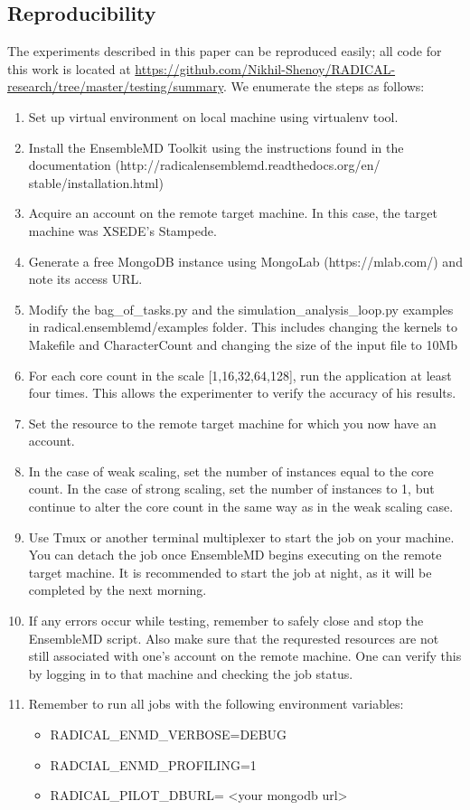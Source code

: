 \documentclass[]{article}
\begin{document}
	\subsection{Reproducibility}
		The experiments described in this paper can be reproduced easily; all code for this work is located at \url{https://github.com/Nikhil-Shenoy/RADICAL-research/tree/master/testing/summary}. We enumerate the steps as follows:
		\begin{enumerate}
			\item Set up virtual environment on local machine using virtualenv tool.
			\item Install the EnsembleMD Toolkit using the instructions found in the documentation (http://radicalensemblemd.readthedocs.org/en/ \\ stable/installation.html)
			\item Acquire an account on the remote target machine. In this case, the target machine was XSEDE's Stampede.
			\item Generate a free MongoDB instance using MongoLab (https://mlab.com/) and note its access URL.	
			\item Modify the bag\_of\_tasks.py and the simulation\_analysis\_loop.py examples in radical.ensemblemd/examples folder. This includes changing the kernels to Makefile and CharacterCount and changing the size of the input file to 10Mb
			\item For each core count in the scale [1,16,32,64,128], run the application at least four times. This allows the experimenter to verify the accuracy of his results.
			\item Set the resource to the remote target machine for which you now have an account.
			\item In the case of weak scaling, set the number of instances equal to the core count. In the case of strong scaling, set the number of instances to 1, but continue to alter the core count in the same way as in the weak scaling case.
			\item Use Tmux or another terminal multiplexer to start the job on your machine. You can detach the job once EnsembleMD begins executing on the remote target machine. It is recommended to start the job at night, as it will be completed by the next morning.
			\item If any errors occur while testing, remember to safely close and stop the EnsembleMD script. Also make sure that the requrested resources are not still associated with one's account on the remote machine. One can verify this by logging in to that machine and checking the job status.
			\item Remember to run all jobs with the following environment variables:
				\begin{itemize}
					\item RADICAL\_ENMD\_VERBOSE=DEBUG
					\item RADCIAL\_ENMD\_PROFILING=1
					\item RADICAL\_PILOT\_DBURL= <your mongodb url>
				\end{itemize}
		\end{enumerate}
\end{document}
